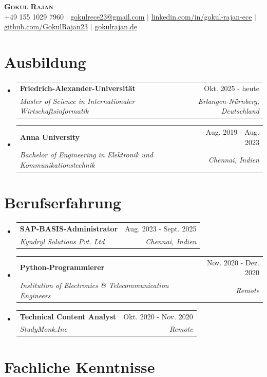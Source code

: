 \documentclass[letterpaper,10.95pt]{article}
\makeatletter
\newcommand{\resumeSubheading}[4]{
  \vspace{-2pt}\item
    \begin{tabular*}{0.97\textwidth}[t]{l@{\extracolsep{\fill}}r}
      \textbf{#1} & #2 \\
      \textit{\small#3} & \textit{\small #4} \\
    \end{tabular*}\vspace{-7pt}
}
\newcommand{\resumeSubHeadingListStart}{\begin{itemize}[leftmargin=0.15in, label={}]}
\newcommand{\resumeSubHeadingListEnd}{\end{itemize}}
\newcommand{\resumeItemListStart}{\begin{itemize}}
\newcommand{\resumeItemListEnd}{\end{itemize}\vspace{-5pt}}
\makeatother
\begin{document}
\begin{center}
    \textbf{\Huge \scshape Gokul Rajan} \\ \vspace{3pt}
    \small %
    \small +49 155 1029 7960 $|$ \href{mailto:gokulrece23@gmail.com}{\underline{gokulrece23@gmail.com}} $|$
    \href{https://linkedin.com/in/gokul-rajan-ece}{\underline{linkedin.com/in/gokul-rajan-ece}} $|$
    \href{https://github.com/GokulRajan23}{\underline{github.com/GokulRajan23}} $|$
    \href{https://www.gokulrajan.de/}{\underline{gokulrajan.de}}
\end{center}


\section{Ausbildung}
  \resumeSubHeadingListStart
    \resumeSubheading
      {Friedrich-Alexander-Universität}{Okt. 2025 - heute}
      {Master of Science in Internationaler Wirtschaftsinformatik}{Erlangen-Nürnberg, Deutschland}
    \resumeSubheading
      {Anna University}{Aug. 2019 - Aug. 2023}
      {Bachelor of Engineering in Elektronik und Kommunikationstechnik}{Chennai, Indien}
  \resumeSubHeadingListEnd


\section{Berufserfahrung}
  \resumeSubHeadingListStart

    \resumeSubheading
      {SAP-BASIS-Administrator}{Aug. 2023 - Sept. 2025}
      {Kyndryl Solutions Pvt. Ltd}{Chennai, Indien}
\resumeItemListStart
\resumeItemListEnd

    \resumeSubheading
      {Python-Programmierer}{Nov. 2020 - Dez. 2020}
      {Institution of Electronics \& Telecommunication Engineers}{Remote}
\resumeItemListStart
\resumeItemListEnd

    \resumeSubheading
      {Technical Content Analyst}{Okt. 2020 - Nov. 2020}
      {StudyMonk.Inc}{Remote}
\resumeItemListStart
\resumeItemListEnd

  \resumeSubHeadingListEnd


\section*{Fachliche Kenntnisse}
\end{document}
